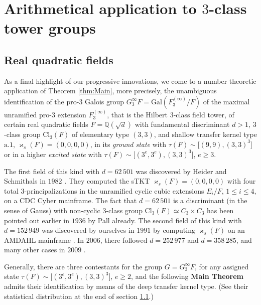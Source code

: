 \documentclass{amsart}
\theoremstyle{definition}
\numberwithin{equation}{section}
\begin{document}


\section{Arithmetical application to \(3\)-class tower groups}
\label{s:3ClassTowers}

\subsection{Real quadratic fields}
\label{ss:RealQuadratic}
\noindent
As a final highlight of our progressive innovations,
we come to a number theoretic application of Theorem
\ref{thm:Main},
more precisely, the unambiguous identification of the pro-\(3\) Galois group
\(G_3^\infty{F}=\mathrm{Gal}(F_3^{(\infty)}/F)\)
of the maximal unramified pro-\(3\) extension \(F_3^{(\infty)}\),
that is the Hilbert \(3\)-class field tower,
of certain real quadratic fields \(F=\mathbb{Q}(\sqrt{d})\)
with fundamental discriminant \(d>1\),
\(3\)-class group \(\mathrm{Cl}_3(F)\) of elementary type \((3,3)\),
and shallow transfer kernel type \(\mathrm{a}.1\), \(\varkappa_s(F)=(0,0,0,0)\),
in its \textit{ground state} with \(\tau(F)\sim\lbrack (9,9),(3,3)^3\rbrack\)
or in a higher \textit{excited state} with \(\tau(F)\sim\lbrack (3^e,3^e),(3,3)^3\rbrack\), \(e\ge 3\).

The first field of this kind with \(d=62\,501\) was discovered by Heider and Schmithals in \(1982\)
\cite{HeSm}.
They computed the sTKT \(\varkappa_s(F)=(0,0,0,0)\) with four total \(3\)-principalizations
in the unramified cyclic cubic extensions \(E_i/F\), \(1\le i\le 4\), on a CDC Cyber mainframe.
The fact that \(d=62\,501\) is a  discriminant
(in the sense of Gauss)
with non-cyclic \(3\)-class group \(\mathrm{Cl}_3(F)\simeq C_3\times C_3\)
has been pointed out earlier in \(1936\) by Pall
\cite{Pa}
already.
The second field of this kind with \(d=152\,949\)
was discovered by ourselves in \(1991\) by computing \(\varkappa_s(F)\) on an AMDAHL mainframe
\cite{Ma04}.
In \(2006\), there followed \(d=252\,977\) and \(d=358\,285\), and many other cases in \(2009\)
\cite{Ma1,Ma3}.

Generally, there are three contestants for the group \(G=G_3^\infty{F}\),
for any assigned state \(\tau(F)\sim\lbrack (3^e,3^e),(3,3)^3\rbrack\), \(e\ge 2\),
and the following \textbf{Main Theorem} admits their identification by means of the deep transfer kernel type.
(See their statistical distribution at the end of section
\ref{ss:RealQuadratic}.)
\end{document}
